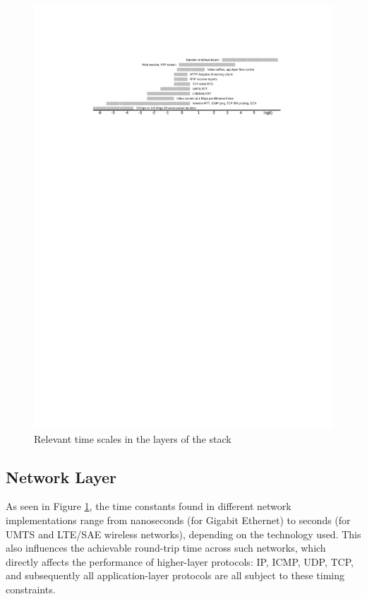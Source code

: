 \begin{figure}[htbp]
	\includegraphics[width=\textwidth]{images/timescales.pdf}
	\caption{Relevant time scales in the layers of the stack}
	\label{c3:fig:timescales}
\end{figure}



\subsection{Network Layer}

As seen in Figure \ref{c3:fig:timescales}, the time constants found in different network implementations range from nanoseconds (for Gigabit Ethernet) to seconds (for UMTS and LTE/SAE wireless networks), depending on the technology used. This also influences the achievable round-trip time across such networks, which directly affects the performance of higher-layer protocols: IP, ICMP, UDP, TCP, and subsequently all application-layer protocols are all subject to these timing constraints.

